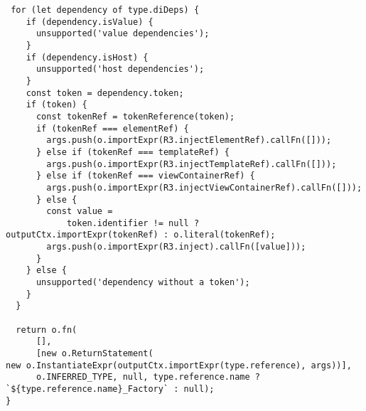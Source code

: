 \begin{verbatim}
 for (let dependency of type.diDeps) {
    if (dependency.isValue) {
      unsupported('value dependencies');
    }
    if (dependency.isHost) {
      unsupported('host dependencies');
    }
    const token = dependency.token;
    if (token) {
      const tokenRef = tokenReference(token);
      if (tokenRef === elementRef) {
        args.push(o.importExpr(R3.injectElementRef).callFn([]));
      } else if (tokenRef === templateRef) {
        args.push(o.importExpr(R3.injectTemplateRef).callFn([]));
      } else if (tokenRef === viewContainerRef) {
        args.push(o.importExpr(R3.injectViewContainerRef).callFn([]));
      } else {
        const value =
            token.identifier != null ?
outputCtx.importExpr(tokenRef) : o.literal(tokenRef);
        args.push(o.importExpr(R3.inject).callFn([value]));
      }
    } else {
      unsupported('dependency without a token');
    }
  }

  return o.fn(
      [],
      [new o.ReturnStatement(
new o.InstantiateExpr(outputCtx.importExpr(type.reference), args))],
      o.INFERRED_TYPE, null, type.reference.name ?
`${type.reference.name}_Factory` : null);
}
\end{verbatim}

